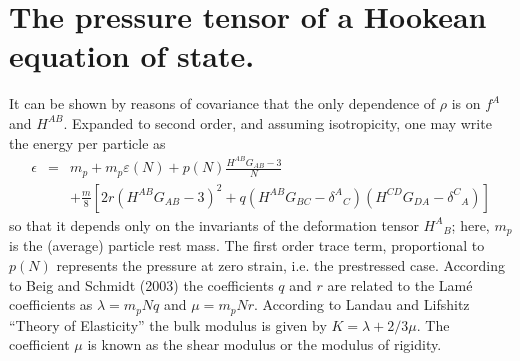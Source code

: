 \section{The pressure tensor of a Hookean equation of state.}

It can be shown by reasons of covariance that the only dependence of $\rho$ is on $f^A$ and $H^{AB}$. Expanded to second order, and assuming isotropicity, one may write the energy per particle as
\begin{equation}
\label{eqn:eos}
\begin{array}{rcl}
\epsilon & = & \displaystyle{m_p + m_p\varepsilon(N) + p(N)\frac{H^{AB}G_{AB}-3}{N}} \\
 && + \frac{m}{8}\left[ 2r\left(H^{AB}G_{AB}-3\right)^2 + q\left(H^{AB}G_{BC} - \delta^{A}{}_C\right)\left(H^{CD}G_{DA} - \delta^{C}{}_A\right) \right]
 \end{array}
\end{equation}
so that it depends only on the invariants of the deformation tensor $H^{A}{}_{B}$; here, $m_p$ is the (average) particle rest mass. The first order trace term, proportional to $p(N)$ represents the pressure at zero strain, i.e. the prestressed case. According to Beig and Schmidt (2003) the coefficients $q$ and $r$ are related to the Lam\'e coefficients as $\lambda = m_pNq$ and $\mu = m_pNr$. According to Landau and Lifshitz ``Theory of Elasticity'' the bulk modulus is given by $K=\lambda + 2/3 \mu$. The coefficient $\mu$ is known as the shear modulus or the modulus of rigidity.

